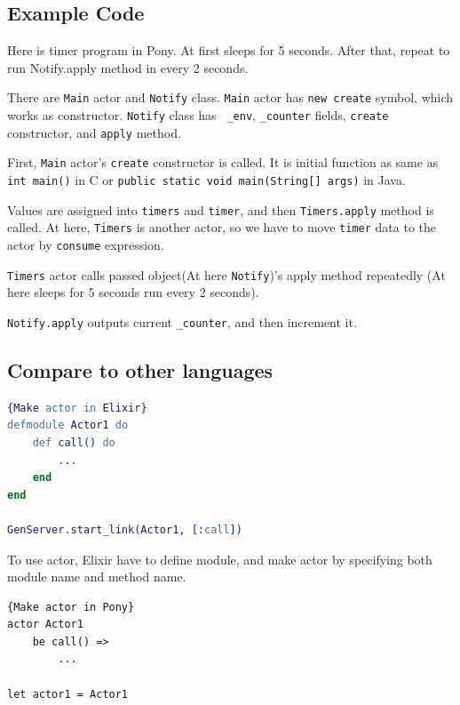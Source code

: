 \documentclass{article}
\begin{document}
\begin{multicols}{2}
\subsection{Example Code}



Here is timer program in Pony.
At first sleeps for 5 seconds. After that, repeat to run Notify.apply method in every 2 seconds.

There are \texttt{Main} actor and \texttt{Notify} class. 
\texttt{Main} actor has \texttt{new create} symbol, which works as constructor.
\texttt{Notify} class has \texttt{ \_env}, \texttt{\_counter} fields, \texttt{create} constructor, and \texttt{apply} method.

First, \texttt{Main} actor's \texttt{create} constructor is called. It is initial function as same as \texttt{int main()} in C or \texttt{public static void main(String[] args)} in Java. 

Values are assigned into \texttt{timers} and \texttt{timer}, and then \texttt{Timers.apply} method is called. 
At here, \texttt{Timers} is another actor, so we have to move \texttt{timer} data to the actor by \texttt{consume} expression.

 \texttt{Timers} actor calls passed object(At here \texttt{Notify})'s apply method repeatedly (At here sleeps for 5 seconds run every 2 seconds). 
 
\texttt{Notify.apply} outputs current \texttt{\_counter}, and then increment it.




\subsection{Compare to other languages}

\begin{lstlisting}[language=Erlang]{Make actor in Elixir}
defmodule Actor1 do
	def call() do
		...
	end	
end	

GenServer.start_link(Actor1, [:call])
\end{lstlisting}

To use actor, Elixir have to define module, and make actor by specifying both module name and method name.

\begin{lstlisting}{Make actor in Pony}
actor Actor1
	be call() =>
		...
		
let actor1 = Actor1		
\end{lstlisting}


\end{multicols}
\end{document}
